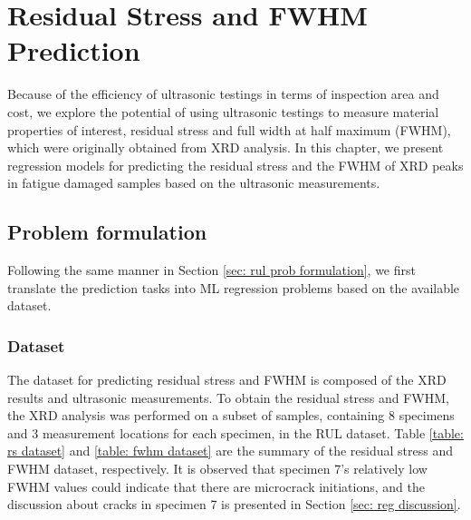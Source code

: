 \chapter{Residual Stress and FWHM Prediction}
\label{chap: reg}

Because of the efficiency of ultrasonic testings in terms of inspection area and cost, we explore the potential of using ultrasonic testings to measure material properties of interest, residual stress and full width at half maximum (FWHM), which were originally obtained from XRD analysis. In this chapter, we present regression models for predicting the residual stress and the FWHM of XRD peaks in fatigue damaged samples based on the ultrasonic measurements. 

\section{Problem formulation}
Following the same manner in Section \ref{sec: rul prob formulation}, we first translate the prediction tasks into ML regression problems based on the available dataset.

\subsection{Dataset}
The dataset for predicting residual stress and FWHM is composed of the XRD results and ultrasonic measurements. To obtain the residual stress and FWHM, the XRD analysis was performed on a subset of samples, containing 8 specimens and 3 measurement locations for each specimen, in the RUL dataset. Table \ref{table: rs dataset} and \ref{table: fwhm dataset} are the summary of the residual stress and FWHM dataset, respectively. It is observed that specimen 7's relatively low FWHM values could indicate that there are microcrack initiations, and the discussion about cracks in specimen 7 is presented in Section \ref{sec: reg discussion}.

